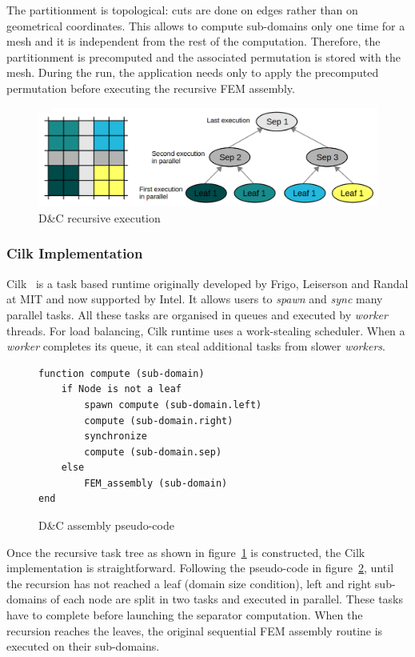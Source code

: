 \documentclass{IOS-Book-Article}
\begin{document}
The partitionment is topological: cuts are done on edges rather than on geometrical coordinates.
This allows to compute sub-domains only one time for a mesh and it is independent from the rest of the computation.
Therefore, the partitionment is precomputed and the associated permutation is stored with the mesh.
During the run, the application needs only to apply the precomputed permutation before executing the recursive FEM assembly.
\begin{figure}[htp]
 \centering
 \includegraphics[scale=0.25]{DC_recursion.png}
 \caption{D\&C recursive execution}
 \label{fig:DCrec}
\end{figure}

\subsubsection{Cilk Implementation}
Cilk~\cite{cilk5} is a task based runtime originally developed by Frigo, Leiserson and Randal at MIT and now supported by Intel.
It allows users to \emph{spawn} and \emph{sync} many parallel tasks.
All these tasks are organised in queues and executed by \emph{worker} threads.
For load balancing, Cilk runtime uses a work-stealing scheduler. When a \emph{worker} completes its queue, it can steal additional tasks from slower \emph{workers}.

\begin{figure}[htp]
\small
 \begin{verbatim}
function compute (sub-domain) 
    if Node is not a leaf
        spawn compute (sub-domain.left)
        compute (sub-domain.right)
        synchronize
        compute (sub-domain.sep)
    else
        FEM_assembly (sub-domain)
end        
 \end{verbatim}
 \caption{D\&C assembly pseudo-code}
 \label{fig:DCcode}
\end{figure}

Once the recursive task tree as shown in figure~\ref{fig:DCrec} is constructed, the Cilk implementation is straightforward.
Following the pseudo-code in figure~\ref{fig:DCcode}, until the recursion has not reached a leaf (domain size condition), left and right sub-domains of each node are split in two tasks and executed in parallel.
These tasks have to complete before launching the separator computation. 
When the recursion reaches the leaves, the original sequential FEM assembly routine is executed on their sub-domains.
\end{document}
